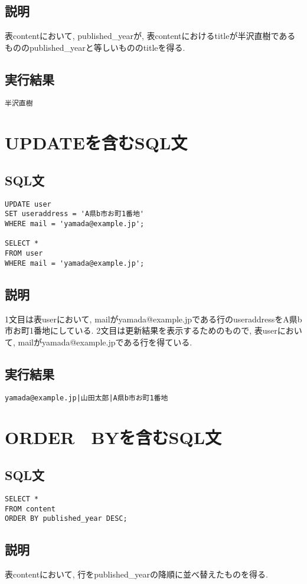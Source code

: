 \documentclass{jarticle}
\begin{document}
\subsection{説明}
表contentにおいて, published\_yearが, 表contentにおけるtitleが半沢直樹であるもののpublished\_yearと等しいもののtitleを得る.
\subsection{実行結果}
\begin{verbatim}
半沢直樹
\end{verbatim}
\section{UPDATEを含むSQL文}
\subsection{SQL文}
\begin{verbatim}
UPDATE user 
SET useraddress = 'A県b市お町1番地' 
WHERE mail = 'yamada@example.jp';

SELECT * 
FROM user 
WHERE mail = 'yamada@example.jp';
\end{verbatim}
\subsection{説明}
1文目は表userにおいて, mailがyamada@example.jpである行のuseraddressをA県b市お町1番地にしている.
2文目は更新結果を表示するためのもので, 表userにおいて, mailがyamada@example.jpである行を得ている.
\subsection{実行結果}
\begin{verbatim}
yamada@example.jp|山田太郎|A県b市お町1番地
\end{verbatim}
\section{ORDER　BYを含むSQL文}
\subsection{SQL文}
\begin{verbatim}
SELECT * 
FROM content 
ORDER BY published_year DESC;
\end{verbatim}
\subsection{説明}
表contentにおいて, 行をpublished\_yearの降順に並べ替えたものを得る.
\end{document}

